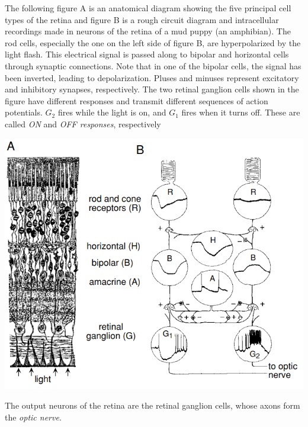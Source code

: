 \begin{exm}
  The following figure A is an anatomical diagram showing the five principal cell types of the retina and figure B is a rough circuit diagram and intracellular recordings made in neurons of the retina of a mud puppy (an amphibian). The rod cells, especially the one on the left side of figure B, are hyperpolarized by the light flash. This electrical signal is passed along to bipolar and horizontal cells through synaptic connections. Note that in one of the bipolar cells, the signal has been inverted, leading to depolarization. Pluses and minuses represent excitatory and inhibitory synapses, respectively.
  The two retinal ganglion cells shown in the figure have different responses and transmit different sequences of action potentials. $G_2$ fires while the light is on, and $G_1$ fires when it turns off. These are called \emph{ON} and \emph{OFF responses}, respectively
  \begin{center}
    \includegraphics[scale=0.25]{./png/dogRetina}
  \end{center}
\end{exm}

\begin{defn}
  \label{defn:opticNerve}
  The output neurons of the retina are the retinal ganglion cells, whose axons form the \emph{optic nerve}.
\end{defn}


